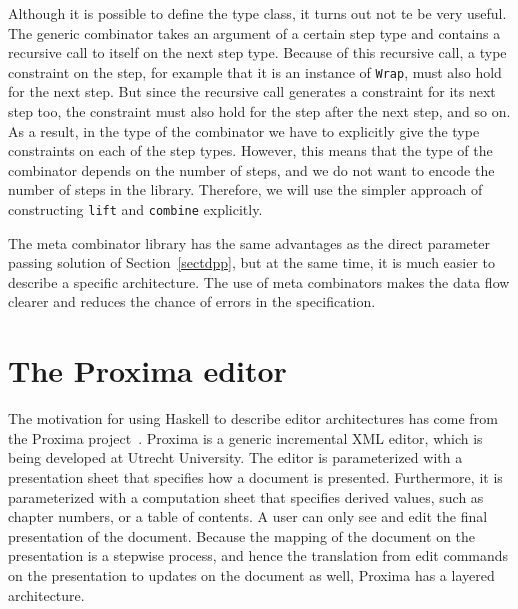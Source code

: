 Although it is possible to define the type class, it turns out not te be very useful. The generic combinator takes an argument of a certain step type and contains a recursive call to itself on the next step type. Because of this recursive call, a type constraint on the step, for example that it is an instance of \texttt{Wrap}, must also hold for the next step. But since the recursive call generates a constraint for its next step too, the constraint must also hold for the step after the next step, and so on. As a result, in the type of the combinator we have to explicitly give the type constraints on each of the step types. However, this means that the type of the combinator depends on the number of steps, and we do not want to encode the number of steps in the library. Therefore, we will use the simpler approach of constructing \texttt{lift} and \texttt{combine} explicitly.

The meta combinator library has the same advantages as the direct parameter passing solution of Section~\ref{sectdpp}, but at the same time, it is much easier to describe a specific architecture. The use of meta combinators makes the data flow clearer and reduces the chance of errors in the specification.


%																
%																
%																
\section{The Proxima editor} \label{sectproxima}

The motivation for using Haskell to describe editor architectures has come from the Proxima project~\cite{proxima}. Proxima is a generic incremental XML editor, which is being developed at Utrecht University. The editor is parameterized with a presentation sheet that specifies how a document is presented. Furthermore, it is parameterized with a computation sheet that specifies derived values, such as chapter numbers, or a table of contents. A user can only see and edit the final presentation of the document. Because the mapping of the document on the presentation is a stepwise process, and hence the translation from edit commands on the presentation to updates on the document as well, Proxima has a layered architecture.

